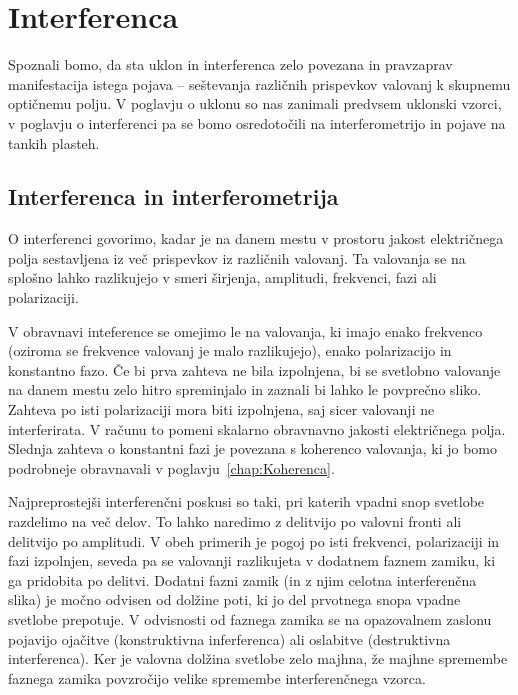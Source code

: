 
\chapter{Interferenca}
Spoznali bomo, da sta uklon in interferenca zelo povezana in pravzaprav
manifestacija istega pojava -- seštevanja različnih prispevkov valovanj k 
skupnemu optičnemu polju. V poglavju o uklonu so nas zanimali predvsem uklonski 
vzorci, v poglavju o interferenci pa se bomo osredotočili na interferometrijo 
in pojave na tankih plasteh.

\section{Interferenca in interferometrija}
O interferenci govorimo, kadar je na danem mestu v prostoru jakost električnega polja
sestavljena iz več prispevkov iz različnih valovanj. Ta valovanja se na splošno
lahko razlikujejo v smeri širjenja, amplitudi, frekvenci, fazi ali polarizaciji. 

V obravnavi inteference se omejimo le na valovanja, ki imajo enako frekvenco (oziroma
se frekvence valovanj je malo razlikujejo), enako polarizacijo in konstantno fazo. 
Če bi prva zahteva ne bila izpolnjena, bi se svetlobno valovanje na danem mestu zelo
hitro spreminjalo in zaznali bi lahko le povprečno sliko. Zahteva po isti polarizaciji
mora biti izpolnjena, saj sicer valovanji ne interferirata. V računu to pomeni skalarno 
obravnavno jakosti električnega polja. Slednja zahteva o konstantni fazi 
je povezana s koherenco valovanja, ki jo bomo podrobneje obravnavali v 
poglavju~\ref{chap:Koherenca}. 

Najpreprostejši interferenčni poskusi so taki, pri katerih vpadni snop svetlobe
razdelimo na več delov. To lahko naredimo z delitvijo po valovni fronti ali delitvijo 
po amplitudi. V obeh primerih je pogoj po isti frekvenci, polarizaciji in fazi izpolnjen, 
seveda pa se valovanji razlikujeta v dodatnem faznem zamiku, ki ga pridobita po delitvi.
Dodatni fazni zamik (in z njim celotna interferenčna slika) je močno odvisen od dolžine
poti, ki jo del prvotnega snopa vpadne svetlobe prepotuje. V odvisnosti od faznega zamika
se na opazovalnem zaslonu pojavijo ojačitve (konstruktivna inferferenca) ali oslabitve 
(destruktivna interferenca). Ker je valovna dolžina svetlobe zelo majhna, že majhne 
spremembe faznega zamika povzročijo velike spremembe interferenčnega vzorca. 

